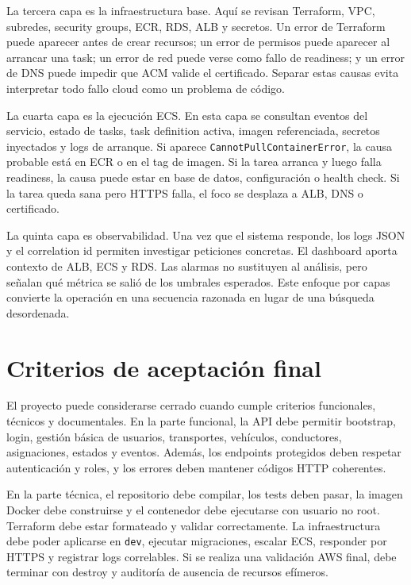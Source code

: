 La tercera capa es la infraestructura base. Aquí se revisan Terraform, VPC, subredes, security groups, ECR, RDS, ALB y secretos. Un error de Terraform puede aparecer antes de crear recursos; un error de permisos puede aparecer al arrancar una task; un error de red puede verse como fallo de readiness; y un error de DNS puede impedir que ACM valide el certificado. Separar estas causas evita interpretar todo fallo cloud como un problema de código.

La cuarta capa es la ejecución ECS. En esta capa se consultan eventos del servicio, estado de tasks, task definition activa, imagen referenciada, secretos inyectados y logs de arranque. Si aparece \texttt{CannotPullContainerError}, la causa probable está en ECR o en el tag de imagen. Si la tarea arranca y luego falla readiness, la causa puede estar en base de datos, configuración o health check. Si la tarea queda sana pero HTTPS falla, el foco se desplaza a ALB, DNS o certificado.

La quinta capa es observabilidad. Una vez que el sistema responde, los logs JSON y el correlation id permiten investigar peticiones concretas. El dashboard aporta contexto de ALB, ECS y RDS. Las alarmas no sustituyen al análisis, pero señalan qué métrica se salió de los umbrales esperados. Este enfoque por capas convierte la operación en una secuencia razonada en lugar de una búsqueda desordenada.

\section{Criterios de aceptación final}
\label{sec:anexo-criterios-finales}

El proyecto puede considerarse cerrado cuando cumple criterios funcionales, técnicos y documentales. En la parte funcional, la API debe permitir bootstrap, login, gestión básica de usuarios, transportes, vehículos, conductores, asignaciones, estados y eventos. Además, los endpoints protegidos deben respetar autenticación y roles, y los errores deben mantener códigos HTTP coherentes.

En la parte técnica, el repositorio debe compilar, los tests deben pasar, la imagen Docker debe construirse y el contenedor debe ejecutarse con usuario no root. Terraform debe estar formateado y validar correctamente. La infraestructura debe poder aplicarse en \texttt{dev}, ejecutar migraciones, escalar ECS, responder por HTTPS y registrar logs correlables. Si se realiza una validación AWS final, debe terminar con destroy y auditoría de ausencia de recursos efímeros.

